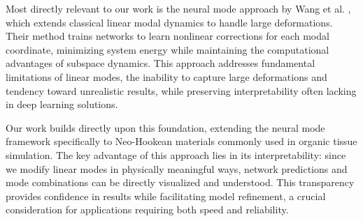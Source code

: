 Most directly relevant to our work is the neural mode approach by Wang et al. \cite{Wang_Du_Coros_Thomaszewski_2024}, which extends classical linear modal dynamics \cite{Pentland_Williams_1989} to handle large deformations. Their method trains networks to learn nonlinear corrections for each modal coordinate, minimizing system energy while maintaining the computational advantages of subspace dynamics. This approach addresses fundamental limitations of linear modes, the inability to capture large deformations and tendency toward unrealistic results, while preserving interpretability often lacking in deep learning solutions.

Our work builds directly upon this foundation, extending the neural mode framework specifically to Neo-Hookean materials commonly used in organic tissue simulation. The key advantage of this approach lies in its interpretability: since we modify linear modes in physically meaningful ways, network predictions and mode combinations can be directly visualized and understood. This transparency provides confidence in results while facilitating model refinement, a crucial consideration for applications requiring both speed and reliability.
